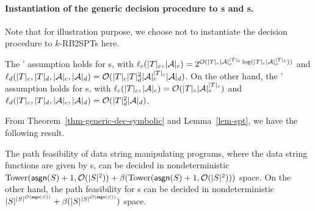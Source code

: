 \paragraph{Instantiation of the generic decision procedure to \SSPT{}s and \SPT{}s.}

Note that for illustration purpose, we choose not to instantiate the decision procedure to $k$-RB2SPTs here.


\begin{lemma}\label{lem-spt}
The \prerec' assumption holds for \SSPT{}s, with $\ell_c(|T|_c, |\mathcal{A}|_c) = 2^{\mathcal{O}( |T|_c |\mathcal{A}|_c^{|T|_c} \log (|T|_c |\mathcal{A}|_c^{|T|_c}))}$ and  $\ell_d(|T|_c, |T|_d, |\mathcal{A}|_c, |\mathcal{A}|_d) = \mathcal{O}(|T|_c  |T|^2_d |\mathcal{A}|_c^{|T|_c} |\mathcal{A}|_d)$. On the other hand, the \prerec' assumption holds for \SPT{}s, with $\ell_c(|T|_c, |\mathcal{A}|_c) =\mathcal{O}(|T|_c |\mathcal{A}|_c^{|T|_c})$ and  $\ell_d(|T|_c, |T|_d, |\mathcal{A}|_c, |\mathcal{A}|_d) = \mathcal{O}(|T|^2_d |\mathcal{A}|_d)$.
%
\end{lemma}


From Theorem~\ref{thm-generic-dec-symbolic} and Lemma~\ref{lem-spt}, we have the following result.
\begin{theorem}\label{thm-spt}
The path feasibility of data string manipulating programs, where the data string functions are given by \SSPT{}s, can be decided in nondeterministic $\mathrm{Tower}(\mathsf{asgn}(S)+1, \mathcal{O}(|S|^2)) + \beta(\mathrm{Tower}(\mathsf{asgn}(S)+1, \mathcal{O}(|S|^2)))$  space. On the other hand,  the path feasibility for \SPT{}s can be decided in nondeterministic $|S|^{|S|^{\mathcal{O}(\mathsf{asgn}(S))}} + \beta(|S|^{|S|^{\mathcal{O}(\mathsf{asgn}(S))}})$ space.
\end{theorem}




